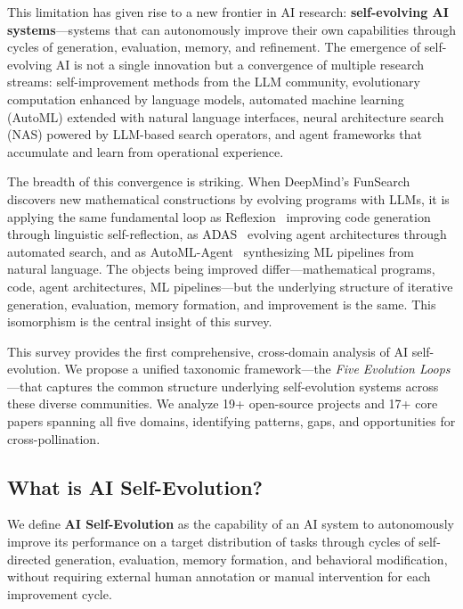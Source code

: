 This limitation has given rise to a new frontier in AI research: \textbf{self-evolving AI systems}---systems that can autonomously improve their own capabilities through cycles of generation, evaluation, memory, and refinement. The emergence of self-evolving AI is not a single innovation but a convergence of multiple research streams: self-improvement methods from the LLM community, evolutionary computation enhanced by language models, automated machine learning (AutoML) extended with natural language interfaces, neural architecture search (NAS) powered by LLM-based search operators, and agent frameworks that accumulate and learn from operational experience.

The breadth of this convergence is striking. When DeepMind's FunSearch~\citep{romera2024funsearch} discovers new mathematical constructions by evolving programs with LLMs, it is applying the same fundamental loop as Reflexion~\citep{shinn2023reflexion} improving code generation through linguistic self-reflection, as ADAS~\citep{hu2024adas} evolving agent architectures through automated search, and as AutoML-Agent~\citep{chen2024automlagent} synthesizing ML pipelines from natural language. The objects being improved differ---mathematical programs, code, agent architectures, ML pipelines---but the underlying structure of iterative generation, evaluation, memory formation, and improvement is the same. This isomorphism is the central insight of this survey.

This survey provides the first comprehensive, cross-domain analysis of AI self-evolution. We propose a unified taxonomic framework---the \emph{Five Evolution Loops}---that captures the common structure underlying self-evolution systems across these diverse communities. We analyze 19+ open-source projects and 17+ core papers spanning all five domains, identifying patterns, gaps, and opportunities for cross-pollination.


\subsection{What is AI Self-Evolution?}
\label{sec:definition}

We define \textbf{AI Self-Evolution} as the capability of an AI system to autonomously improve its performance on a target distribution of tasks through cycles of self-directed generation, evaluation, memory formation, and behavioral modification, without requiring external human annotation or manual intervention for each improvement cycle.

